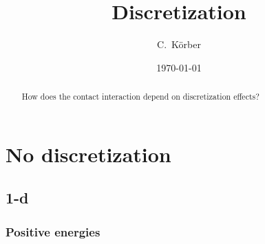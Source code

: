 \documentclass[
    aps,
    prl,
    showkeys,
    nofootinbib,
    floatfix
]{revtex4-1}
\begin{document}
\title{Discretization}

\author{C.~Körber}

\date{\today}

\begin{abstract}%
	How does the contact interaction depend on discretization effects?
\end{abstract}

\maketitle

\section{No discretization}
\subsection{1-d}
\subsubsection{Positive energies}
\end{document}
